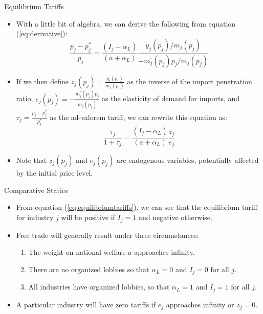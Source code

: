 \documentclass[aspectratio=169]{beamer}
\begin{document}
\begin{frame}{Equilibrium Tariffs}

\begin{itemize}
    \item<1-> With a little bit of algebra, we can derive the following from equation (\ref{eq:derivative}):
    \begin{equation*}
        \frac{p_{j} - p_{j}^{*}}{p_{j}} = \frac{\left( I_{j} - \alpha_{L} \right)}{\left( a + \alpha_{L} \right)} \frac{y_{j}\left( p_{j} \right) / m_{j}\left( p_{j} \right)}{-m_{j}^{'}\left( p_{j} \right) p_{j} / m_{j}\left( p_{j} \right)}
    \end{equation*}
    \item<2-> If we then define $ z_{j}\left( p_{j} \right) = \frac{y_{i}\left( p_{i} \right)}{m_{i}\left( p_{i} \right)} $ as the inverse of the import penetration ratio, $ e_{j}\left( p_{j} \right) = -\frac{m_{j}^{'}\left( p_{j} \right) p_{j}}{m_{j}\left( p_{j} \right)} $ as the elasticity of demand for imports, and $ \tau_{j} = \frac{p_{j} - p_{j}^{*}}{p_{j}^{*}} $ as the ad-valorem tariff, we can rewrite this equation as:
    \begin{equation}
        \frac{\tau_{j}}{1 + \tau_{j}} = \frac{\left( I_{j} - \alpha_{L} \right)}{\left( a + \alpha_{L} \right)} \frac{z_{j}}{e_{j}}
        \label{eq:equilibriumtariffs}
    \end{equation}
    \item<3-> Note that $ z_{j}\left( p_{j} \right) $ and $ e_{j}\left( p_{j} \right) $ are endogenous variables, potentially affected by the initial price level.
\end{itemize}
    
\end{frame}


\begin{frame}{Comparative Statics}

\begin{itemize}
    \item<1-> From equation (\ref{eq:equilibriumtariffs}), we can see that the equilibrium tariff for industry $ j $ will be positive if $ I_{j} = 1 $ and negative otherwise.
    \item<2-> Free trade will generally result under three circumstances:
    \begin{enumerate}
        \item The weight on national welfare $ a $ approaches infinity.
        \item  There are no organized lobbies so that $ \alpha_{L} = 0 $ and $ I_{j} = 0 $ for all $ j $.
        \item All industries have organized lobbies, so that $ \alpha_{L} = 1 $ and $ I_{j} = 1 $ for all $ j $.
    \end{enumerate}
    \item<3-> A particular industry will have zero tariffs if $ e_{j} $ approaches infinity or $ z_{j} = 0 $. 
\end{itemize}
    
\end{frame}
\end{document}
